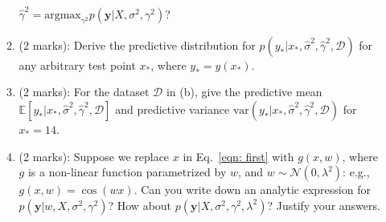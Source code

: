 \documentclass[11pt]{article}
\newcommand{\mbf}[1]{{\boldsymbol{\mathbf{#1}}}}
\renewcommand{\bm}{\mbf}
\begin{document}
\begin{enumerate}
\begin{enumerate}[label=(\alph*)]
$\hat{\gamma}^2 =  \text{argmax}_{\gamma^2} p(\bm{y} | X, \sigma^2, \gamma^2)$?
\item (2 marks): Derive the predictive distribution for $p( y_* | {x}_*, \hat{\sigma}^2, \hat{\gamma}^2, \mathcal{D})$ for any arbitrary test point $x_*$,
where $y_* = y(x_*)$.
\item (2 marks): For the dataset $\mathcal{D}$ in (b), give the predictive mean $\mathbb{E}[y_* | x_*, \hat{\sigma}^2, \hat{\gamma}^2, \mathcal{D}]$ and predictive variance $\text{var}(y_* |  x_*, \hat{\sigma}^2, \hat{\gamma}^2, \mathcal{D})$ for $x_* = 14$.
\item (2 marks): Suppose we replace $x$ in Eq.~\eqref{eqn: first} with $g(x,w)$, where $g$ is a non-linear function parametrized by $w$,
and $w \sim \mathcal{N}(0,\lambda^2)$: e.g., $g(x,w) = \cos (w x)$.  Can you write down an analytic expression for $p(\bm{y} | w, X, \sigma^2, \gamma^2)$?  How about $p(\bm{y} | X, \sigma^2, \gamma^2, \lambda^2)$?  Justify your answers.

\end{enumerate}





\end{enumerate}
\end{document}
